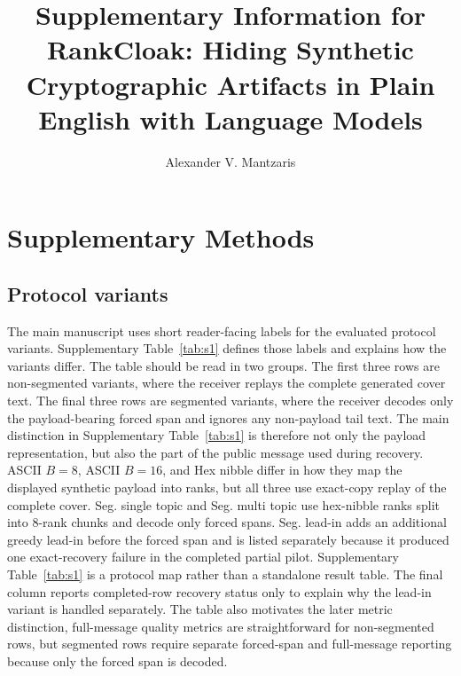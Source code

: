 \documentclass[fleqn,10pt]{wlscirep}
\title{Supplementary Information for\\
RankCloak: Hiding Synthetic Cryptographic Artifacts in Plain English with Language Models}
\author[1,*]{Alexander V. Mantzaris}
\affil[1]{School of Data, Mathematical, and Statistical Sciences, University of Central Florida, Orlando, FL, United States of America}
\affil[*]{Correspondence: alexander.mantzaris@ucf.edu}
\begin{document}
\maketitle

\section*{Supplementary Methods}

\subsection*{Protocol variants}
The main manuscript uses short reader-facing labels for the evaluated protocol variants. Supplementary Table~\ref{tab:s1} defines those labels and explains how the variants differ. The table should be read in two groups. The first three rows are non-segmented variants, where the receiver replays the complete generated cover text. The final three rows are segmented variants, where the receiver decodes only the payload-bearing forced span and ignores any non-payload tail text.
The main distinction in Supplementary Table~\ref{tab:s1} is therefore not only the payload representation, but also the part of the public message used during recovery. ASCII \(B=8\), ASCII \(B=16\), and Hex nibble differ in how they map the displayed synthetic payload into ranks, but all three use exact-copy replay of the complete cover. Seg. single topic and Seg. multi topic use hex-nibble ranks split into 8-rank chunks and decode only forced spans. Seg. lead-in adds an additional greedy lead-in before the forced span and is listed separately because it produced one exact-recovery failure in the completed partial pilot.
Supplementary Table~\ref{tab:s1} is a protocol map rather than a standalone result table. The final column reports completed-row recovery status only to explain why the lead-in variant is handled separately. The table also motivates the later metric distinction, full-message quality metrics are straightforward for non-segmented rows, but segmented rows require separate forced-span and full-message reporting because only the forced span is decoded.
\end{document}

